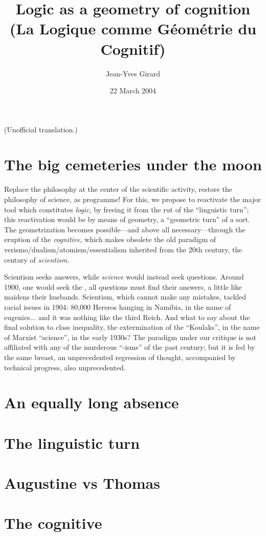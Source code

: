 \documentclass{article}
\author{Jean-Yves Girard}
\title{Logic as a geometry of cognition \\ (La Logique comme Géométrie du Cognitif)}
\date{22 March 2004}
\begin{document}
\maketitle
\noindent
(Unofficial translation.)

\section{The big cemeteries under the moon}
Replace the philosophy at the center of the scientific activity, restore the philosophy of science, as programme! For this, we propose to reactivate the major tool which constitutes \emph{logic}, by freeing it from the rut of the \enquote{linguistic turn}; this reactivation would be by means of geometry, a \enquote{geometric turn} of a sort. The geometrization becomes possible---and above all necessary---through the eruption of the \emph{cognitive}, which makes obsolete the old paradigm of verismo/dualism/atomism/essentialism inherited from the 20th century, the century of \emph{scientism}.

Scientism seeks answers, while \emph{science} would instead seek questions. Around 1900, one would seek the , all questions must find their answers, a little like maidens their husbands. Scientism, which cannot make any mistakes, tackled racial issues in 1904: 80,000 Hereros hanging in Namibia, in the name of eugenics... and it was nothing like the third Reich. And what to say about the final solution to class inequality, the extermination of the \enquote{Koulaks}, in the name of Marxist \enquote{science}, in the early 1930s? The paradigm under our critique is not affiliated with any of the murderous \enquote{-isms} of the past century; but it is fed by the same breast, an unprecedented regression of thought, accompanied by technical progress, also unprecedented.

\section{An equally long absence}
\section{The linguistic turn}
\section{Augustine vs Thomas}
\section{The cognitive}
\end{document}
